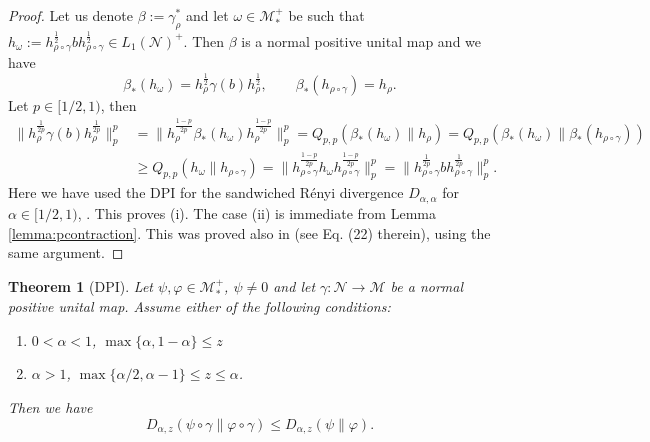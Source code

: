 \documentclass[12pt]{article}
\newtheorem{theorem}{Theorem}[section]
\theoremstyle{definition}
\theoremstyle{remark}
\numberwithin{equation}{section}
\def\Me{\mathcal M}
\def\Ne{\mathcal N}
\begin{document}
\begin{proof} Let us denote $\beta:=\gamma_\rho^*$ and let $\omega\in \Me_*^+$ be such
that 
$h_\omega:=h_{\rho\circ\gamma}^{\frac12}bh_{\rho\circ\gamma}^{\frac12}\in L_1(\Ne)^+$. Then
$\beta$ is a normal positive unital map and  we have 
\[
\beta_*(h_\omega)=h_\rho^{\frac12}\gamma(b)h_\rho^{\frac12},\qquad
\beta_*(h_{\rho\circ\gamma})=h_\rho.
\]
Let $p\in [1/2,1)$, then  
\begin{align*}
\|h_{\rho}^{\frac{1}{2p}}\gamma(b)h_{\rho}^{\frac{1}{2p}}\|^p_p&=
\|h_\rho^{\frac{1-p}{2p}}\beta_*(h_\omega)h_\rho^{\frac{1-p}{2p}}\|_p^p=
Q_{p,p}(\beta_*(h_\omega)\|h_\rho)=Q_{p,p}(\beta_*(h_\omega)\|\beta_*(h_{\rho\circ\gamma}))\\
&\ge  Q_{p,p}(h_\omega\|h_{\rho\circ\gamma})=\|h_{\rho\circ\gamma}^{\frac{1-p}{2p}}h_\omega
h_{\rho\circ\gamma}^{\frac{1-p}{2p}}\|_p^p=\|h_{\rho\circ\gamma}^{\frac{1}{2p}}bh_{\rho\circ\gamma}^{\frac{1}{2p}}\|^p_p.
\end{align*}
Here we have used the DPI for the sandwiched R\'enyi  divergence $D_{\alpha,\alpha}$ for
$\alpha\in [1/2,1)$, \cite[Theorem 4.1]{jencova2021renyi}.  This proves (i). The case (ii) is immediate from Lemma \ref{lemma:pcontraction}. This was proved also 
in \cite{kato2023onrenyi} (see Eq. (22) therein), using the same argument.



\end{proof}



\begin{theorem}[DPI] \label{thm:dpi} Let $\psi,\varphi\in \Me_*^+$, $\psi\ne 0$ and let $\gamma:
\Ne\to \Me$ be a normal positive unital map. Assume either of the following conditions:
\begin{enumerate}
\item[(i)] $0<\alpha<1$, $\max\{\alpha,1-\alpha\}\le z$
\item[(ii)] $\alpha>1$, $\max\{\alpha/2,\alpha-1\}\le z\le \alpha$.
\end{enumerate}
Then we have
\[
D_{\alpha,z}(\psi\circ\gamma\|\varphi\circ\gamma)\le D_{\alpha,z}(\psi\|\varphi).
\]


\end{theorem}
\end{document}
